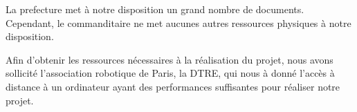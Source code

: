 
La prefecture met à notre disposition un grand nombre de documents.
Cependant, le commanditaire ne met aucunes autres ressources physiques à notre disposition.


Afin d'obtenir les ressources nécessaires à la réalisation du projet, nous avons sollicité l'association robotique de Paris, la DTRE, qui nous à donné l'accès à distance à un ordinateur ayant des performances suffisantes pour réaliser notre projet.

